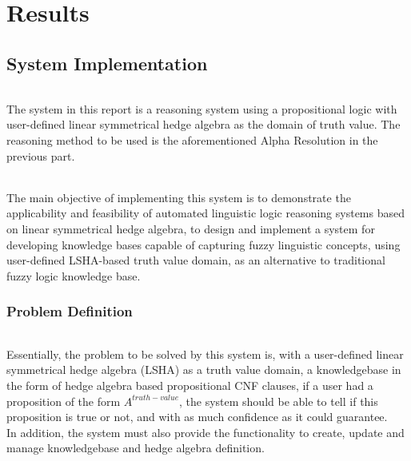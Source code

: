 \documentclass[../gr-final.tex]{subfiles}
\begin{document}
%
\part{Results}
\chapter{System Implementation}

\paragraph{} The system in this report is a reasoning system using a
propositional logic with user-defined linear symmetrical hedge algebra
as the domain of truth value. The reasoning method to be used is the
aforementioned Alpha Resolution in the previous part.
	
\paragraph{} The main objective of implementing this system is to demonstrate the applicability and feasibility of automated linguistic logic reasoning systems based on linear symmetrical hedge algebra, to design and implement a system for developing knowledge bases capable of capturing fuzzy linguistic 
concepts, using user-defined LSHA-based truth value domain, as an alternative to traditional fuzzy logic knowledge base.



\section{Problem Definition}

\paragraph{}Essentially, the problem to be solved by this system is,
with a user-defined linear symmetrical hedge algebra (LSHA) as a truth value
domain, a knowledgebase in the form of hedge algebra based
propositional CNF  clauses, if a user had a proposition of the form
\(A^{truth-value}\), the system should be able to tell if this
proposition is true or not, and with as much confidence as it could guarantee.\\
In addition, the system must also provide the
functionality to create, update and manage knowledgebase and
hedge algebra definition. 
\end{document}
